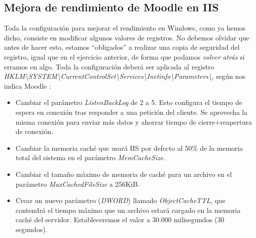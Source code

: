 	\subsection{Mejora de rendimiento de Moodle en IIS}
	Toda la configuración para mejorar el rendimiento en Windows, como ya hemos dicho, consiste en modificar algunos valores de registros. No debemos olvidar 	que antes de hacer esto, estamos ``obligados'' a realizar una copia de seguridad del registro, igual que en el ejercicio anterior, de forma que podamos 			\emph{volver atrás} si erramos en algo. Toda la configuración deberá ser aplicada al registro \emph{HKLM\textbackslash SYSTEM\textbackslash 					CurrentControlSet\textbackslash Services\textbackslash Inetinfo\textbackslash Parameters\textbackslash}, según nos indica Moodle \cite{moodleiis}:
	\begin{itemize}
		\item Cambiar el parámetro \emph{ListenBackLog} de 2 a 5. Esto configura el tiempo de espera en conexión tras responder a una petición del cliente. Se aprovecha la misma conexión para enviar más datos y ahorrar tiempo de cierre+reapertura de conexión.
		\item Cambiar la memoria caché que usará IIS por defecto al 50\% de la memoria total del sistema en el parámetro \emph{MemCacheSize}.
		\item Cambiar el tamaño máximo de memoria de caché para un archivo en el parámetro \emph{MaxCachedFileSize} a 256KiB.
		\item Crear un nuevo parámetro (\emph{DWORD}) llamado \emph{ObjectCacheTTL}, que contendrá el tiempo máximo que un archivo estará cargado en la memoria caché del servidor. Estableceremos el valor a 30.000 milisegundos (30 segundos).
	\end{itemize}

